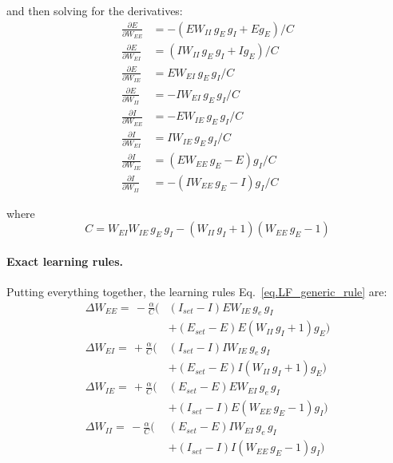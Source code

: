 \documentclass[twocolumn]{article}
\newcommand{\EE}{\mathit{EE}}
\newcommand{\EI}{\mathit{EI}}
\newcommand{\IE}{\mathit{IE}}
\newcommand{\II}{\mathit{II}}
\newcommand{\set}{\mathit{set}}
\begin{document}
\noindent and then solving for the derivatives:
\begin{equation}
\begin{aligned}
\frac{\partial E}{\partial W_{\EE}} & = -(E W_{\II} \, g_E \, g_I + E g_E)/C \\
\frac{\partial E}{\partial W_{\EI}} & = (I W_{\II} \, g_E \,g_I + I g_E)/C \\
\frac{\partial E}{\partial W_{\IE}} & = E W_{\EI} \, g_E \, g_I/C \\
\frac{\partial E}{\partial W_{\II}} & = -I W_{\EI} \, g_E \, g_I/C \\
\frac{\partial I}{\partial W_{\EE}} & = -E W_{\IE} \, g_E \, g_I/C \\
\frac{\partial I}{\partial W_{\EI}} & = I W_{\IE} \, g_E \, g_I/C \\
\frac{\partial I}{\partial W_{\IE}} & = (E W_{\EE} \, g_E - E) g_I/C \\
\frac{\partial I}{\partial W_{\II}} & = -(I W_{\EE} \, g_E - I)g_I/C
\end{aligned}
\label{eq.LF_explicit_derivs}
\end{equation}

\noindent where
\begin{displaymath}
C = W_{\EI} W_{\IE} \, g_E\, g_I - (W_{\II} \, g_I + 1)(W_{\EE} \, g_E - 1)
\end{displaymath}


\paragraph{Exact learning rules.}

Putting everything together, the learning rules Eq.\ \ref{eq.LF_generic_rule} are:
\begin{equation}
\begin{aligned}
\Delta W_{\EE} = \, -\frac{\alpha}{C}
( & (I_{\set} - I) E W_{\IE} \, g_e \, g_I \\
& + (E_{\set} - E) E (W_{\II} \, g_I + 1)g_E) \\
\Delta W_{\EI} = \, +\frac{\alpha}{C}
( & (I_{\set} - I) I W_{\IE}\, g_e \, g_I \\
& + (E_{\set} - E) I (W_{\II} \, g_I + 1)g_E) \\
\Delta W_{\IE} = \, +\frac{\alpha}{C}
( & (E_{\set} - E) E W_{\EI}\, g_e \, g_I \\
& + (I_{\set} - I) E (W_{\EE} \, g_E - 1)g_I) \\
\Delta W_{\II} = \, -\frac{\alpha}{C}
( & (E_{\set} - E) I W_{\EI}\, g_e \, g_I \\
& + (I_{\set} - I) I (W_{\EE} \, g_E - 1)g_I)
\end{aligned}
\end{equation}
\end{document}
